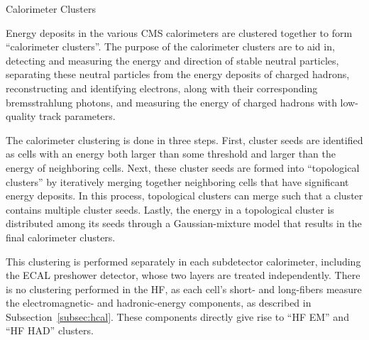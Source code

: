 \begin{section}{Calorimeter Clusters}

Energy deposits in the various CMS calorimeters are clustered together to form ``calorimeter clusters''.
The purpose of the calorimeter clusters are to aid in,  detecting and measuring the energy and direction of stable neutral particles, separating these neutral particles from the energy deposits of charged hadrons, reconstructing and identifying electrons, along with their corresponding bremsstrahlung photons, and measuring the energy of charged hadrons with low-quality track parameters.

The calorimeter clustering is done in three steps. First, cluster seeds are identified as cells with an energy both larger than some threshold and larger than the energy of neighboring cells.
Next, these cluster seeds are formed into ``topological clusters'' by iteratively merging together neighboring cells that have significant energy deposits.
In this process, topological clusters can merge such that a cluster contains multiple cluster seeds.
Lastly, the energy in a topological cluster is distributed among its seeds through a Gaussian-mixture model that results in the final calorimeter clusters.

This clustering is performed separately in each subdetector calorimeter, including the ECAL preshower detector, whose two layers are treated independently.
There is no clustering performed in the HF, as each cell's short- and long-fibers measure the electromagnetic- and hadronic-energy components, as described in Subsection~\ref{subsec:hcal}.
These components directly give rise to ``HF EM'' and ``HF HAD'' clusters.

\end{section}

